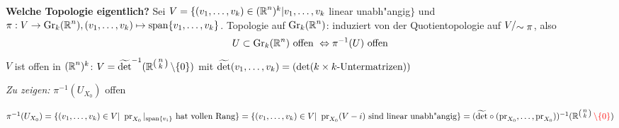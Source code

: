 \textbf{Welche Topologie eigentlich?} Sei $V = \{ (v_1,\ldots, v_k) \in (\operatorname{\mathbb{R}}^n)^k | v_1,\ldots, v_k$ linear unabh"angig$\}$ und $\pi: V \to \operatorname{Gr}_k(\operatorname{\mathbb{R}}^n), (v_1,\ldots ,v_k) \mapsto \operatorname{span}\{v_1,\ldots ,v_k\}$. Topologie auf $\operatorname{Gr}_k(\operatorname{\mathbb{R}}^n)$: induziert von der Quotientopologie auf $V/_{\displaystyle \sim\pi}$, also
	\[U \subset \operatorname{Gr}_k(\operatorname{\mathbb{R}}^n) \text{ offen } \Leftrightarrow \pi^{-1}(U) \text{ offen} \]
$V$ ist offen in $(\operatorname{\mathbb{R}}^n)^k$: $V = \widetilde{\operatorname{det}}^{-1}(\operatorname{\mathbb{R}}^{\left(\begin{smallmatrix}n \\ k\end{smallmatrix}\right)} \setminus \{0\})$ mit $\widetilde{\operatorname{det}}(v_1,\ldots,v_k) = (\operatorname{det}(k \times k\text{-Untermatrizen}))$

\emph{Zu zeigen:} $\pi^{-1}(U_{X_0})$ offen

$\pi^{-1}(U_{X_0}) = \{(v_1,\ldots ,v_k) \in V |\ \operatorname{pr}_{X_0}|_{\operatorname{span}\{v_i\}} \text{ hat vollen Rang}\} = \{(v_1,\ldots ,v_k) \in V|\ \operatorname{pr}_{X_0}(V-i) \text{ sind linear unabh"angig} \} = (\widetilde{\operatorname{det}} \circ (\operatorname{pr}_{X_0},\ldots ,\operatorname{pr}_{X_0}))^{-1}(\operatorname{\mathbb{R}}^{\left(\begin{smallmatrix}n \\ k\end{smallmatrix}\right)} \textcolor{red}{\setminus \{0\}})$

